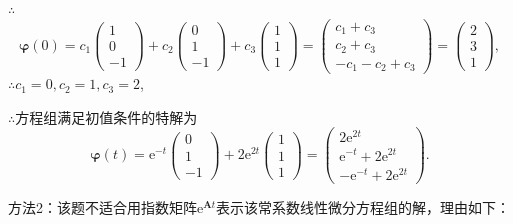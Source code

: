 \documentclass[12pt,UTF8]{ctexart}
\newcommand{\me}[0]{\mathrm e}
\begin{document}
\begin{enumerate}
$\therefore$
\[\bm\varphi(0)=c_1\begin{pmatrix}1\\0\\-1\end{pmatrix}+c_2\begin{pmatrix}0\\1\\-1\end{pmatrix}+c_3\begin{pmatrix}1\\1\\1\end{pmatrix}=\begin{pmatrix}c_1+c_3\\c_2+c_3\\-c_1-c_2+c_3\end{pmatrix}=\begin{pmatrix}2\\3\\1\end{pmatrix},\]
$\therefore c_1=0,c_2=1,c_3=2$,

$\therefore$方程组满足初值条件的特解为
\[\bm\varphi(t)=\me^{-t}\begin{pmatrix}0\\1\\-1\end{pmatrix}+2\me^{2t}\begin{pmatrix}1\\1\\1\end{pmatrix}=\begin{pmatrix}2\me^{2t}\\\me^{-t}+2\me^{2t}\\-\me^{-t}+2\me^{2t}\end{pmatrix}.\]

方法2：该题不适合用指数矩阵$\me^{\bm At}$表示该常系数线性微分方程组的解，理由如下：


\end{enumerate}
\end{document}
